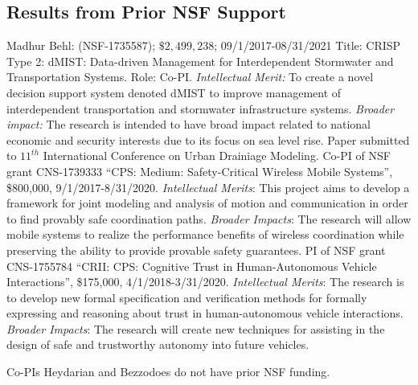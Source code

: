 \subsection{Results from Prior NSF Support}
\label{subsec:prior}
Madhur Behl: (NSF-1735587); $\$2,499,238$; 09/1/2017-08/31/2021 Title: CRISP Type 2: dMIST: Data-driven Management for Interdependent Stormwater and Transportation Systems. Role: Co-PI. \emph{Intellectual Merit:} To create a novel decision support system denoted dMIST to improve management of interdependent transportation and stormwater infrastructure systems. %
\emph{Broader impact:} The research is intended to have broad impact related to national economic and security interests due to its focus on sea level rise. Paper submitted to $11^{th}$ International Conference on Urban Drainiage Modeling. 
\newline
{}
Co-PI of NSF grant CNS-1739333 ``CPS: Medium: Safety-Critical Wireless Mobile Systems'', \$800,000, 9/1/2017-8/31/2020. \emph{Intellectual Merits}: This project aims to develop a framework for joint modeling and analysis of motion and communication in order to find provably safe coordination paths. \emph{Broader Impacts}: The research will allow mobile systems to realize the performance benefits of wireless coordination while preserving the ability to provide provable safety guarantees. 
\newline
PI of NSF grant CNS-1755784 ``CRII: CPS: Cognitive Trust in Human-Autonomous Vehicle Interactions'', \$175,000, 4/1/2018-3/31/2020.
\emph{Intellectual Merits}: The research is to develop new formal specification and verification methods for formally expressing and reasoning about trust in human-autonomous vehicle interactions.
\emph{Broader Impacts}: The research will create new techniques for assisting in the design of safe and trustworthy autonomy into future vehicles.

Co-PIs Heydarian and Bezzodoes do not have prior NSF funding. 

